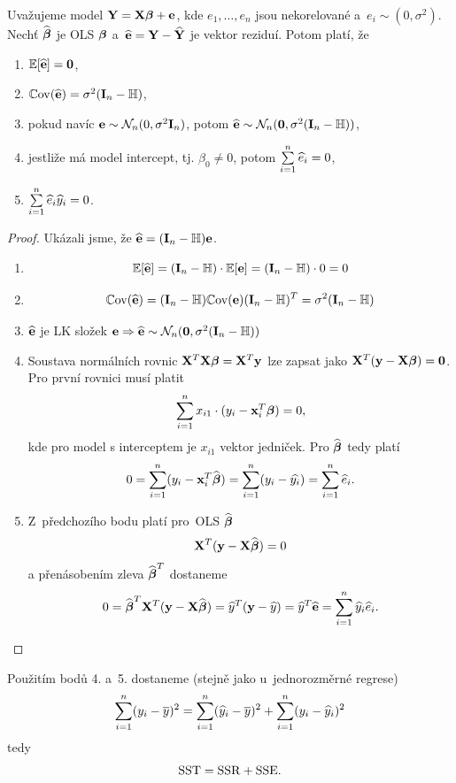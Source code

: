 \begin{theorem}
	Uvažujeme model $\Y = \X \betab + \eb$, kde $e_1,\dots, e_n$ jsou nekorelované a~$e_i \sim (0,\sigma^2)$. Nechť $\wbetab$ je OLS $\betab$ a~$\heb = \Y - \hYb$ je vektor reziduí. Potom platí, že

\begin{enumerate}
\item $\E [\heb] = \nula$,
\item $\Cov(\heb) = \sigma^2 (\In - \Hm)$,
\item pokud navíc $\eb \sim \NN_n (0, \sigma^2 \In)$, potom $\heb \sim \NN_n (\nula, \sigma^2 (\In - \Hm))$,
\item jestliže má model intercept, tj. $\beta_0 \neq 0$, potom $\sumin \widehat{e}_i = 0$,
\item $\sumin \widehat{e}_i \widehat{y}_i = 0$.
\end{enumerate}		
\end{theorem}

\begin{proof}
Ukázali jsme, že $\heb = (\In - \Hm) \eb$.
\begin{enumerate}
\item $$\E [\heb] = (\In - \Hm) \cdot \E [\eb] = (\In - \Hm) \cdot 0 = 0$$
\item $$\Cov(\heb) = (\In - \Hm) \Cov(\eb) (\In - \Hm)^T = \sigma^2 (\In - \Hm)$$
\item $\heb$ je LK složek $\eb  \Rightarrow  \heb \sim \NN_n (\nula, \sigma^2 (\In - \Hm))$
\item Soustava normálních rovnic $\X^T \X \betab = \X^T \y$ lze zapsat jako $\X^T (\y - \X \betab) = \nula$. Pro první rovnici musí platit
 $$
 \sumin x_{i1} \cdot (y_i - \x_i^T \betab) = 0,
 $$
kde pro model s interceptem je $x_{i1}$ vektor jedniček. Pro $\wbetab$ tedy platí
 $$
 0 = \sumin (y_i - \x_i^T \wbetab) = \sumin (y_i - \widehat{y_i}) = \sumin \he_i.
 $$
\item Z~předchozího bodu platí pro~OLS $\wbetab$
 $$
 \X^T (\y - \X \wbetab) = 0
 $$
a přenásobením zleva $\wbetab^T$ dostaneme
 $$
  0 = \wbetab^T \X^T (\y - \X \wbetab) = \widehat{y}^T (\y - \hy) = \hy^T \heb = \sumin \hy_i \he_i.
 $$
\end{enumerate}
\end{proof}
\begin{remark}
Použitím bodů 4. a~5. dostaneme (stejně jako u~jednorozměrné regrese)
$$
\sumin (y_i - \overline{y})^2 = \sumin (\widehat{y}_i - \overline{y})^2 + \sumin (y_i - \widehat{y}_i)^2
$$
tedy
$$
\SST = \SSR + \SSE.
$$
\end{remark}

